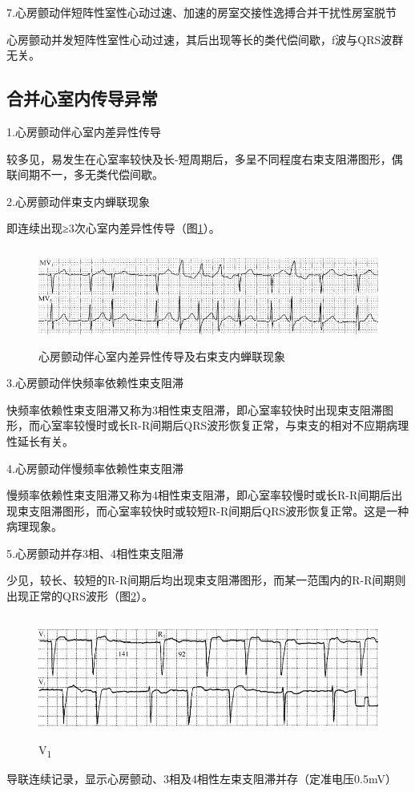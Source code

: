 7.心房颤动伴短阵性室性心动过速、加速的房室交接性逸搏合并干扰性房室脱节

心房颤动并发短阵性室性心动过速，其后出现等长的类代偿间歇，f波与QRS波群无关。

\protect\hypertarget{text00020.htmlux5cux23subid206}{}{}

\subsection{合并心室内传导异常}

1.心房颤动伴心室内差异性传导

较多见，易发生在心室率较快及长-短周期后，多呈不同程度右束支阻滞图形，偶联间期不一，多无类代偿间歇。

2.心房颤动伴束支内蝉联现象

即连续出现≥3次心室内差异性传导（图\ref{fig13-24}）。

\begin{figure}[!htbp]
 \centering
 \includegraphics[width=5.58333in,height=1.26042in]{./images/Image00232.jpg}
 \captionsetup{justification=centering}
 \caption{心房颤动伴心室内差异性传导及右束支内蝉联现象}
 \label{fig13-24}
  \end{figure} 

3.心房颤动伴快频率依赖性束支阻滞

快频率依赖性束支阻滞又称为3相性束支阻滞，即心室率较快时出现束支阻滞图形，而心室率较慢时或长R-R间期后QRS波形恢复正常，与束支的相对不应期病理性延长有关。

4.心房颤动伴慢频率依赖性束支阻滞

慢频率依赖性束支阻滞又称为4相性束支阻滞，即心室率较慢时或长R-R间期后出现束支阻滞图形，而心室率较快时或较短R-R间期后QRS波形恢复正常。这是一种病理现象。

5.心房颤动并存3相、4相性束支阻滞

少见，较长、较短的R-R间期后均出现束支阻滞图形，而某一范围内的R-R间期则出现正常的QRS波形（图\ref{fig13-25}）。

\begin{figure}[!htbp]
 \centering
 \includegraphics[width=5.58333in,height=1.60417in]{./images/Image00233.jpg}
 \captionsetup{justification=centering}
 \caption{V\textsubscript{1}}
 \label{fig13-25}
  \end{figure} 
导联连续记录，显示心房颤动、3相及4相性左束支阻滞并存（定准电压0.5mV）

